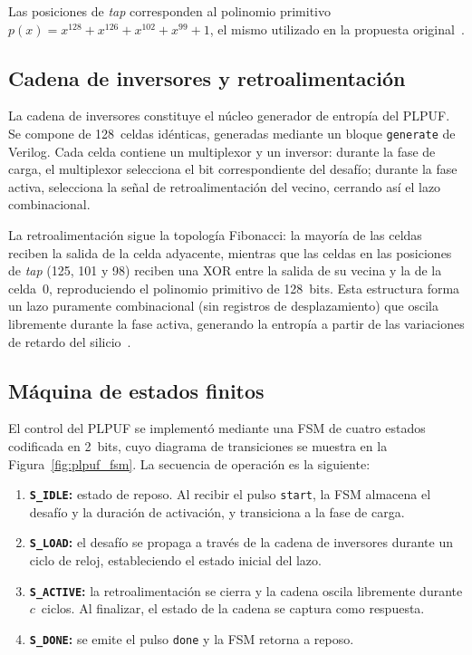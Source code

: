 Las posiciones de \textit{tap} corresponden al polinomio primitivo
$p(x) = x^{128} + x^{126} + x^{102} + x^{99} + 1$, el mismo utilizado en la
propuesta original~\cite{hori_2011_pseudolfsr}.

\subsection{Cadena de inversores y retroalimentación}
\label{sec:cadena}

La cadena de inversores constituye el núcleo generador de entropía del
PLPUF. Se compone de 128~celdas idénticas, generadas mediante un bloque
\texttt{generate} de Verilog. Cada celda contiene un multiplexor y un
inversor: durante la fase de carga, el multiplexor selecciona el bit
correspondiente del desafío; durante la fase activa, selecciona la señal de
retroalimentación del vecino, cerrando así el lazo combinacional.

La retroalimentación sigue la topología Fibonacci: la mayoría de las celdas
reciben la salida de la celda adyacente, mientras que las celdas en las
posiciones de \textit{tap} (125, 101 y 98) reciben una XOR entre la salida
de su vecina y la de la celda~0, reproduciendo el polinomio primitivo de
128~bits. Esta estructura forma un lazo puramente combinacional (sin
registros de desplazamiento) que oscila libremente durante la fase activa,
generando la entropía a partir de las variaciones de retardo del
silicio~\cite{hori_2011_pseudolfsr}.

\subsection{Máquina de estados finitos}
\label{sec:fsm_impl}

El control del PLPUF se implementó mediante una FSM de cuatro estados
codificada en 2~bits, cuyo diagrama de transiciones se muestra en la
Figura~\ref{fig:plpuf_fsm}. La secuencia de operación es la siguiente:

\begin{enumerate}
  \item \textbf{\texttt{S\_IDLE}:} estado de reposo. Al recibir el pulso
    \texttt{start}, la FSM almacena el desafío y la duración de activación, y
    transiciona a la fase de carga.

  \item \textbf{\texttt{S\_LOAD}:} el desafío se propaga a través de la
    cadena de inversores durante un ciclo de reloj, estableciendo el estado
    inicial del lazo.

  \item \textbf{\texttt{S\_ACTIVE}:} la retroalimentación se cierra y la
    cadena oscila libremente durante $c$~ciclos. Al finalizar, el estado de la
    cadena se captura como respuesta.

  \item \textbf{\texttt{S\_DONE}:} se emite el pulso \texttt{done} y la FSM
    retorna a reposo.
\end{enumerate}

